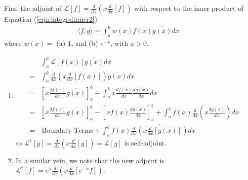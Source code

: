 \begin{Exercise}
Find the adjoint of $\mathcal{L}[f] = \frac{d}{dx}(x\frac{d}{dx}[f])$ with respect to the inner product of Equation (\ref{eqn:integralinner2})
\begin{align*}
\langle f,g \rangle = \int_a^b w(x) f(x) \overline{g(x)} dx    
\end{align*}
where $w(x) =$ (a) $1$, and (b) $e^{-x}$, with $a > 0$.
\end{Exercise}
\begin{Answer}
\begin{enumerate}[label=(\alph*)]
\item 
\begin{align*}
&\int_a^b \mathcal{L}[f(x)] \overline{g(x)} dx \\
=& \int_a^b \frac{d}{dx}\left(x\frac{d}{dx}[f(x)]\right) \overline{g(x)} dx \\
=& \left[x\frac{df(x)}{dx}\overline{g(x)}\right]_a^b - \int_a^b x\frac{df(x)}{dx}\frac{d\overline{g(x)}}{dx} dx \\
=& \left[x\frac{df(x)}{dx}\overline{g(x)}\right]_a^b - [xf(x)\frac{d\overline{g(x)}}{dx}]_a^b + \int_a^b f(x) \frac{d}{dx}\left(x\frac{d\overline{g(x)}}{dx}\right) dx \\
=& \, \text{Boundary Terms} + \int_a^b f(x) \overline{\frac{d}{dx}\left(x\frac{d}{dx}[g(x)]\right)} dx
\end{align*}
so $\mathcal{L}^\dag[g] = \frac{d}{dx}\left(x\frac{d}{dx}[g]\right) = \mathcal{L}[g]$ is self-adjoint.
\item In a similar vein, we note that the new adjoint is \\
$\mathcal{L}^\dag[f] = e^x\frac{d}{dx}\left(x\frac{d}{dx}[e^{-x}f]\right)$.
\end{enumerate}   
\end{Answer}

